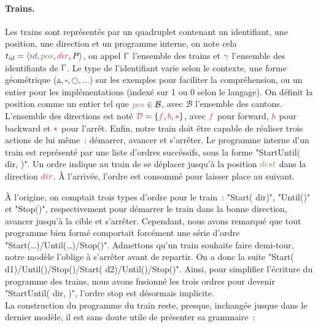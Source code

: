 \documentclass[oneside, a4paper, 11pt]{book}
\newcommand{\nats}{\ensuremath{\mathbb{N}}}
\newcommand{\trainFmt}[1]{{\color{traincolor} #1}}
\newcommand{\trainTuple}[4]{\langle \trainFmt{#1}, \posFmt{#2}, \dirFmt{#3}, #4 \rangle}
\newcommand{\forward}{\ensuremath{\mathtt{f}}\xspace}
\newcommand{\backward}{\ensuremath{\mathtt{b}}\xspace}
\newcommand{\directions}{\dirFmt{\mathcal{D}}}
\newcommand{\dirFmt}[1]{{\color{dircolor} #1}}
\newcommand{\dirForward}{\ensuremath{\dirFmt{\forward}}\xspace}
\newcommand{\dirBackward}{\ensuremath{\dirFmt{\backward}}\xspace}
\newcommand{\dirStop}{\ensuremath{\dirFmt{\star}}\xspace}
\newcommand{\posFmt}[1]{{\color{poscolor}{#1}}}
\newcommand\concatM[2]{#1;#2}
\begin{document}
\paragraph{Trains.} 
Les trains sont représentés par un quadruplet contenant un identifiant, une position, une direction et un programme interne, on note cela $t_{id} = \trainTuple{id}{pos}{dir}{P}$, on appel $\trainFmt{\Gamma}$ l'ensemble des trains et $\trainFmt{\gamma}$ l'ensemble des identifiants de $\trainFmt{\Gamma}$.
Le type de l'identifiant varie selon le contexte, une forme géométrique ($\vartriangle,\square,\bigcirc,\dots$) sur les exemples pour faciliter la compréhension, ou un entier pour les implémentations (indexé sur 1 ou 0 selon le langage).
On définit la position comme un entier tel que $\posFmt{pos} \in \mathcal{B}$, avec $\mathcal{B}$ l'ensemble des cantons. 
L'ensemble des directions est noté $\directions = \{ \dirFmt{f}, \dirFmt{b}, \dirFmt{\star} \}$, avec $\dirFmt{f}$ pour forward, $\dirFmt{b}$ pour backward et $\dirFmt{\star}$ pour l'arrêt.
Enfin, notre train doit être capable de réaliser trois actions de lui même~: démarrer, avancer et s'arrêter.
Le programme interne d'un train est représenté par une liste d'ordres succéssifs, sous la forme "StartUntil(\dirFmt{dir}, \posFmt{dest})".
Un ordre indique au train de se déplacer jusqu'à la position $\posFmt{dest}$ dans la direction $\dirFmt{dir}$. À l'arrivée, l'ordre est consommé pour laisser place au suivant.

\begin{sidebox}
	À l'origine, on comptait trois types d'ordre pour le train~: "Start(\dirFmt{dir})", "Until(\posFmt{dest})" et "Stop()", respectivement pour démarrer le train dans la bonne direction, avancer jusqu'à la cible et s'arrêter.
	Cependant, nous avons remarqué que tout programme bien formé comportait forcément une série d'ordre "Start(\dots)/Until(\dots)/Stop()". Admettons qu'un train souhaite faire demi-tour, notre modèle l'oblige à s'arrêter avant de repartir. On a donc la suite "Start(\dirFmt{d1})/Until(\posFmt{p1})/Stop()/Start(\dirFmt{d2})/Until(\posFmt{p2})/Stop()".
	Ainsi, pour simplifier l'écriture du programme des trains, nous avons fusionné les trois ordres pour devenir "StartUntil(\dirFmt{dir}, \posFmt{dest})", l'ordre stop est désormais implicite.
	\\La construction du programme du train reste, presque, inchangée jusque dans le dernier modèle, il est sans doute utile de présenter sa grammaire~:
	\vspace{0.3cm}\\
	\begin{grammar}
		\firstcasesubtil{T}{\concatM{seq}{T} \gralt \varepsilon}{}
		\firstcasesubtil{seq}{StartUntil(D,\nats)}{ N : naturels}
	\end{grammar}
\end{sidebox}
\end{document}
